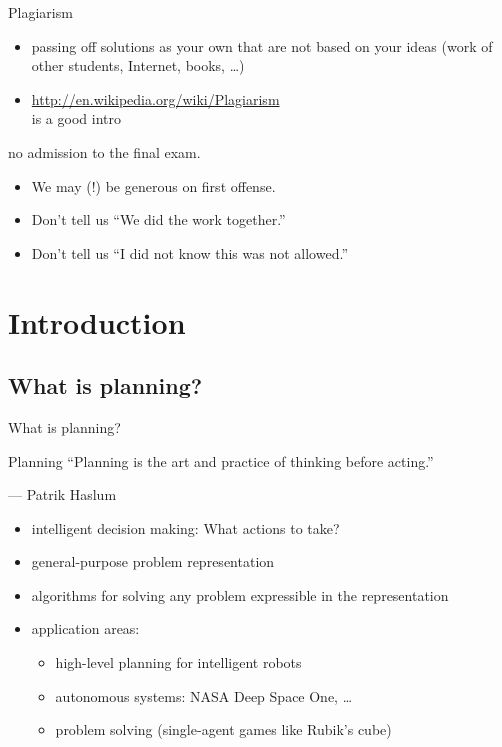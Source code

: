 \documentclass{gkibeamer}
\begin{document}
\begin{frame}{Plagiarism}
  \begin{itemize}
  \item passing off solutions as your own that are not based on your
    ideas (work of other students, Internet, books, \dots)
  \item \url{http://en.wikipedia.org/wiki/Plagiarism} \\
    is a good intro
  \end{itemize}

  \medskip

   no admission to the final exam.
  \begin{itemize}
  \item We may (!) be generous on first offense.
  \item Don't tell us ``We did the work together.''
  \item Don't tell us ``I did not know this was not allowed.''
  \end{itemize}
\end{frame}

\section{Introduction}
\subsection{What is planning?}

\begin{frame}{What is planning?}
  \begin{block}{Planning}
    \alert{``Planning is the art and practice of thinking before
      acting.''}
    
    \hspace*{\fill}--- Patrik Haslum
  \end{block}

  \begin{itemize}
  \item intelligent decision making: What actions to take?
  \item general-purpose problem representation
  \item algorithms for solving any problem expressible in the
    representation
  \item application areas:
    \begin{itemize}
    \item high-level planning for intelligent robots
    \item autonomous systems: NASA Deep Space One, \dots
    \item problem solving (single-agent games like Rubik's cube)
    \end{itemize}
  \end{itemize}
\end{frame}
\end{document}

